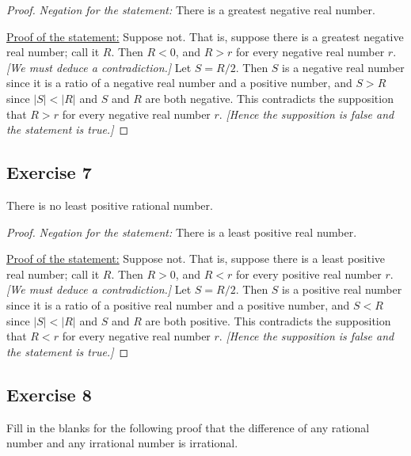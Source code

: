 \documentclass[14pt]{extarticle}
\begin{document}
\begin{proof}
    {\it Negation for the statement:} There is a greatest negative real number.

    \underline{Proof of the statement:} Suppose not. That is, suppose there is a greatest negative real number; call it $R$. Then $R < 0$, and $R > r$ for every negative real number $r$. {\it [We must deduce a contradiction.]} Let $S = R / 2$. Then $S$ is a negative real number since it is a ratio of a negative real number and a positive number, and $S > R$ since $|S| < |R|$ and $S$ and $R$ are both negative. This contradicts the supposition that $R > r$ for every negative real number $r$. {\it [Hence the supposition is false and the statement is true.]}
\end{proof}

\subsection{Exercise 7}
There is no least positive rational number.

\begin{proof}
    {\it Negation for the statement:} There is a least positive real number.

    \underline{Proof of the statement:} Suppose not. That is, suppose there is a least positive real number; call it $R$. Then $R > 0$, and $R < r$ for every positive real number $r$. {\it [We must deduce a contradiction.]} Let $S = R / 2$. Then $S$ is a positive real number since it is a ratio of a positive real number and a positive number, and $S < R$ since $|S| < |R|$ and $S$ and $R$ are both positive. This contradicts the supposition that $R < r$ for every negative real number $r$. {\it [Hence the supposition is false and the statement is true.]}
\end{proof}

\subsection{Exercise 8}
Fill in the blanks for the following proof that the difference of any rational number and any irrational number is irrational.
\end{document}
